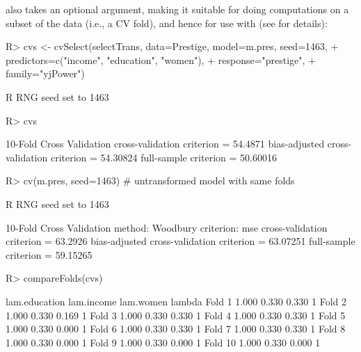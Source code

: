 \documentclass[
]{jss}
\begin{document}
 also takes an optional  argument,
making it suitable for doing computations on a subset of the data (i.e.,
a CV fold), and hence for use with  (see
 for details):

\begin{CodeChunk}
\begin{CodeInput}
R> cvs <- cvSelect(selectTrans, data=Prestige, model=m.pres, seed=1463,
+                 predictors=c("income", "education", "women"),
+                 response="prestige",
+                 family="yjPower")
\end{CodeInput}
\begin{CodeOutput}
R RNG seed set to 1463
\end{CodeOutput}
\begin{CodeInput}
R> cvs
\end{CodeInput}
\begin{CodeOutput}
10-Fold Cross Validation
cross-validation criterion = 54.4871
bias-adjusted cross-validation criterion = 54.30824
full-sample criterion = 50.60016 
\end{CodeOutput}
\begin{CodeInput}
R> cv(m.pres, seed=1463) # untransformed model with same folds
\end{CodeInput}
\begin{CodeOutput}
R RNG seed set to 1463
\end{CodeOutput}
\begin{CodeOutput}
10-Fold Cross Validation
method: Woodbury
criterion: mse
cross-validation criterion = 63.2926
bias-adjusted cross-validation criterion = 63.07251
full-sample criterion = 59.15265 
\end{CodeOutput}
\begin{CodeInput}
R> compareFolds(cvs)
\end{CodeInput}
\begin{CodeOutput}
        lam.education lam.income lam.women lambda
Fold 1          1.000      0.330     0.330      1
Fold 2          1.000      0.330     0.169      1
Fold 3          1.000      0.330     0.330      1
Fold 4          1.000      0.330     0.330      1
Fold 5          1.000      0.330     0.000      1
Fold 6          1.000      0.330     0.330      1
Fold 7          1.000      0.330     0.330      1
Fold 8          1.000      0.330     0.000      1
Fold 9          1.000      0.330     0.000      1
Fold 10         1.000      0.330     0.000      1
\end{CodeOutput}
\end{CodeChunk}
\end{document}
